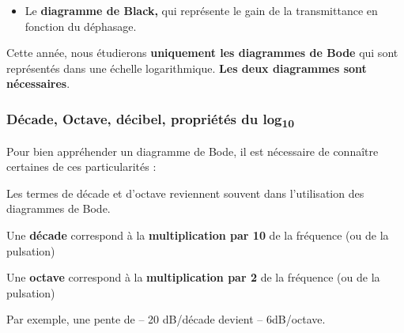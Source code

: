 \begin{itemize}
\item
  Le \textbf{diagramme de Black,} qui représente le gain de la transmittance en fonction du déphasage.
\end{itemize}

Cette année, nous étudierons \textbf{uniquement les diagrammes de Bode} qui sont représentés dans une échelle logarithmique. \textbf{Les deux diagrammes sont nécessaires}.

\hypertarget{duxe9cade-octave-duxe9cibel-propriuxe9tuxe9s-du-log10}{%
\subsubsection{\texorpdfstring{Décade, Octave, décibel, propriétés du log\textsubscript{10}}{Décade, Octave, décibel, propriétés du log10}}\label{duxe9cade-octave-duxe9cibel-propriuxe9tuxe9s-du-log10}}

Pour bien appréhender un diagramme de Bode, il est nécessaire de connaître certaines de ces particularités :

Les termes de décade et d'octave reviennent souvent dans l'utilisation des diagrammes de Bode.

Une \textbf{décade} correspond à la \textbf{multiplication par 10} de la fréquence (ou de la pulsation)

Une \textbf{octave} correspond à la \textbf{multiplication par 2} de la fréquence (ou de la pulsation)

Par exemple, une pente de -- 20 dB/décade devient -- 6dB/octave.

